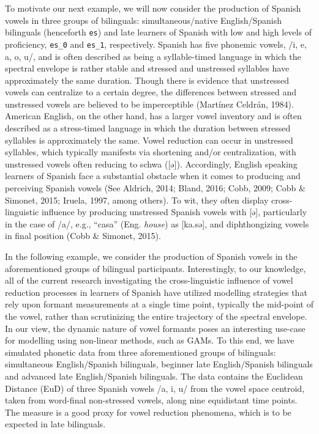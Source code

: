 \documentclass[
  letterpaper,
  DIV=11,
  numbers=noendperiod]{scrartcl}
\begin{document}
To motivate our next example, we will now consider the production of
Spanish vowels in three groups of bilinguals: simultaneous/native
English/Spanish bilinguals (henceforth \texttt{es}) and late learners of
Spanish with low and high levels of proficiency, \texttt{es\_0} and
\texttt{es\_1}, respectively. Spanish has five phonemic vowels, /i, e,
a, o, u/, and is often described as being a syllable-timed language in
which the spectral envelope is rather stable and stressed and unstressed
syllables have approximately the same duration. Though there is evidence
that unstressed vowels can centralize to a certain degree, the
differences between stressed and unstressed vowels are believed to be
imperceptible (Martínez Celdrán, 1984). American English, on the other
hand, has a larger vowel inventory and is often described as a
stress-timed language in which the duration between stressed syllables
is approximately the same. Vowel reduction can occur in unstressed
syllables, which typically manifests via shortening and/or
centralization, with unstressed vowels often reducing to schwa
({[}ə{]}). Accordingly, English speaking learners of Spanish face a
substantial obstacle when it comes to producing and perceiving Spanish
vowels (See Aldrich, 2014; Bland, 2016; Cobb, 2009; Cobb \& Simonet,
2015; Iruela, 1997, among others). To wit, they often display
cross-linguistic influence by producing unstressed Spanish vowels with
{[}ə{]}, particularly in the case of /a/, e.g., ``casa'' (Eng.
\emph{house}) as {[}ka.sə{]}, and diphthongizing vowels in final
position (Cobb \& Simonet, 2015).

In the following example, we consider the production of Spanish vowels
in the aforementioned groups of bilingual participants. Interestingly,
to our knowledge, all of the current research investigating the
cross-linguistic influence of vowel reduction processes in learners of
Spanish have utilized modelling strategies that rely upon formant
measurements at a single time point, typically the mid-point of the
vowel, rather than scrutinizing the entire trajectory of the spectral
envelope. In our view, the dynamic nature of vowel formants poses an
interesting use-case for modelling using non-linear methods, such as
GAMs. To this end, we have simulated phonetic data from three
aforementioned groups of bilinguals: simultaneous English/Spanish
bilinguals, beginner late English/Spanish bilinguals and advanced late
English/Spanish bilinguals. The data contains the Euclidean Distance
(EuD) of three Spanish vowels /a, i, u/ from the vowel space centroid,
taken from word-final non-stressed vowels, along nine equidistant time
points. The measure is a good proxy for vowel reduction phenomena, which
is to be expected in late bilinguals.
\end{document}
